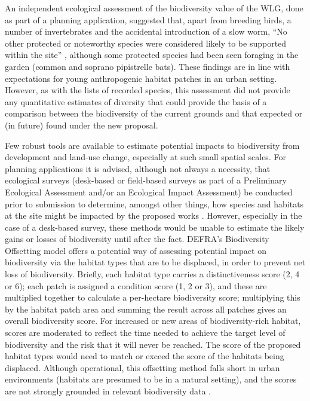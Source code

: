 An independent ecological assessment of the biodiversity value of the WLG, done as part of a planning application, suggested that, apart from breeding birds, a number of invertebrates and the accidental introduction of a slow worm, ``No other protected or noteworthy species were considered likely to be supported within the site'' \citep{ImpactAssessment:2015cf,PrelimEcoAppraisal:2015cf}, although some protected species had been seen foraging in the garden (common and soprano pipistrelle bats). These findings are in line with expectations for young anthropogenic habitat patches in an urban setting. However, as with the lists of recorded species, this assessment did not provide any quantitative estimates of diversity that could provide the basis of a comparison between the biodiversity of the current grounds and that expected or (in future) found under the new proposal.

Few robust tools are available to estimate potential impacts to biodiversity from development and land-use change, especially at such small spatial scales. For planning applications it is advised, although not always a necessity, that ecological surveys (desk-based or field-based surveys as part of a Preliminary Ecological Assessment and/or an Ecological Impact Assessment) be conducted prior to submission to determine, amongst other things, how species and habitats at the site might be impacted by the proposed works \citep{Cieem:2016}. However, especially in the case of a desk-based survey, these methods would be unable to estimate the likely gains or losses of biodiversity until after the fact. DEFRA's Biodiversity Offsetting model \citep{defra:2012bdo} offers a potential way of assessing potential impact on biodiversity via the habitat types that are to be displaced, in order to prevent net loss of biodiversity. Briefly, each habitat type carries a distinctiveness score (2, 4 or 6); each patch is assigned a condition score (1, 2 or 3), and these are multiplied together to calculate a per-hectare biodiversity score; multiplying this by the habitat patch area and summing the result across all patches gives an overall biodiversity score. For increased or new areas of biodiversity-rich habitat, scores are moderated to reflect the time needed to achieve the target level of biodiversity and the risk that it will never be reached. The score of the proposed habitat types would need to match or exceed the score of the habitats being displaced. Although operational, this offsetting method falls short in urban environments (habitats are presumed to be in a natural setting), and the scores are not strongly grounded in relevant biodiversity data \citep[see][]{Baker:2014bdo}.  

